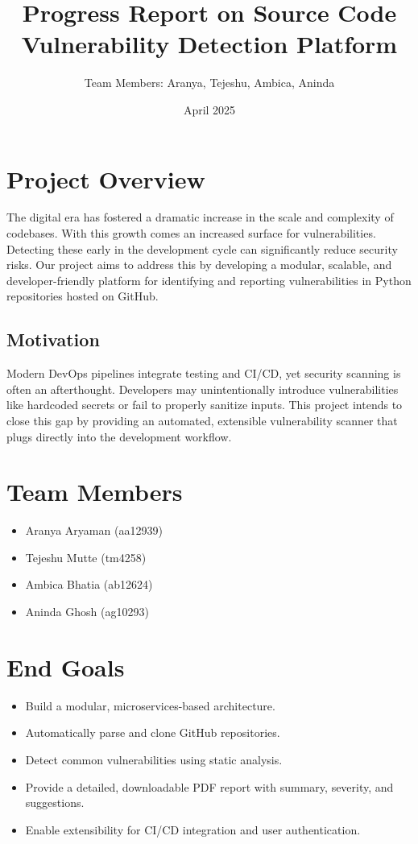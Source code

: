 \documentclass{article}
\title{\textbf{Progress Report on Source Code Vulnerability Detection Platform}}
\author{Team Members: Aranya, Tejeshu, Ambica, Aninda}
\date{April 2025}
\begin{document}
\maketitle

\tableofcontents
\newpage

\section{Project Overview}
The digital era has fostered a dramatic increase in the scale and complexity of codebases. With this growth comes an increased surface for vulnerabilities. Detecting these early in the development cycle can significantly reduce security risks. Our project aims to address this by developing a modular, scalable, and developer-friendly platform for identifying and reporting vulnerabilities in Python repositories hosted on GitHub.

\subsection{Motivation}
Modern DevOps pipelines integrate testing and CI/CD, yet security scanning is often an afterthought. Developers may unintentionally introduce vulnerabilities like hardcoded secrets or fail to properly sanitize inputs. This project intends to close this gap by providing an automated, extensible vulnerability scanner that plugs directly into the development workflow.

\section*{Team Members}
\begin{itemize}
    \item Aranya Aryaman (aa12939)
    \item Tejeshu Mutte (tm4258)
    \item Ambica Bhatia (ab12624)
    \item Aninda Ghosh (ag10293)
\end{itemize}

\section{End Goals}
\begin{itemize}
    \item Build a modular, microservices-based architecture.
    \item Automatically parse and clone GitHub repositories.
    \item Detect common vulnerabilities using static analysis.
    \item Provide a detailed, downloadable PDF report with summary, severity, and suggestions.
    \item Enable extensibility for CI/CD integration and user authentication.
\end{itemize}
\end{document}
